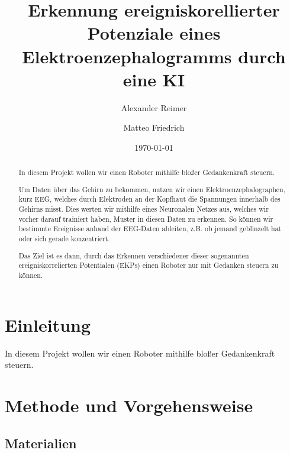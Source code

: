 \documentclass{scrartcl}
\title{Erkennung ereigniskorellierter Potenziale eines Elektroenzephalogramms durch eine KI }
\date{\today}
\author{Alexander Reimer \and Matteo Friedrich}
\begin{document}
	\maketitle
    \begin{abstract}
		In diesem Projekt wollen wir einen Roboter mithilfe bloßer Gedankenkraft steuern.
		
		Um Daten über das Gehirn zu bekommen, nutzen wir einen Elektroenzephalographen, kurz EEG, welches durch Elektroden an der Kopfhaut die Spannungen innerhalb des Gehirns misst. Dies werten wir mithilfe eines Neuronalen Netzes aus, welches wir vorher darauf trainiert haben, Muster in diesen Daten zu erkennen. So können wir bestimmte Ereignisse anhand der EEG-Daten ableiten, z.B. ob jemand geblinzelt hat oder sich gerade konzentriert.
		
		Das Ziel ist es dann, durch das Erkennen verschiedener dieser sogenannten ereigniskorrelierten Potentialen (EKPs) einen Roboter nur mit Gedanken steuern zu können. 
	\end{abstract}

	\newpage

	\tableofcontents

	\newpage

	\section{Einleitung}
	In diesem Projekt wollen wir einen Roboter mithilfe bloßer Gedankenkraft steuern.
	\section{Methode und Vorgehensweise}

	\subsection{Materialien} \label{Materialien}
\end{document}

